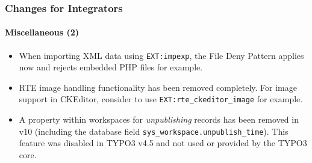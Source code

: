 
\begin{frame}[fragile]
	\frametitle{Changes for Integrators}
	\framesubtitle{Miscellaneous (2)}

	\lstset{basicstyle=\tiny\ttfamily}

	\begin{itemize}

		\item When importing XML data using \texttt{EXT:impexp}, the File Deny Pattern applies
			now and rejects embedded PHP files for example.

		\item RTE image handling functionality has been removed completely.
			For image support in CKEditor, consider to use \texttt{EXT:rte\_ckeditor\_image} for example.

		\item A property within workspaces for \textit{unpublishing} records has been removed in v10
			(including the database field \texttt{sys\_workspace.unpublish\_time}). This feature was
			disabled in TYPO3 v4.5 and not used or provided by the TYPO3 core.

	\end{itemize}

\end{frame}


